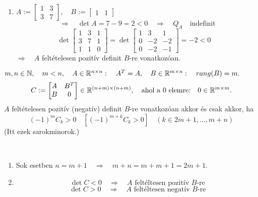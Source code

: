 \documentclass[a4paper,11.5pt]{article}
\begin{document}
\begin{note}
\begin{enumerate}
			\item $A:=\begin{bmatrix}
			1&3\\
			3&7
			\end{bmatrix},\quad B:=\begin{bmatrix}
				1&1
			\end{bmatrix}$
			\[ \Rightarrow\quad \det A=7-9=2<0\quad \Rightarrow\quad Q_A \quad \text{indefinit} \]
			\[ \det \begin{bmatrix}
				1&3&1\\
				3&7&1\\
				1&1&0
			\end{bmatrix}=\det \begin{bmatrix}
				1&3&1\\
				0&-2&-2\\
				0&-2&-1
			\end{bmatrix}=-2<0\quad \]
			$\Rightarrow\quad A$ feltételesen pozitív definit $B$-re vonatkozóan.
		\end{enumerate}
	\end{note}
	\begin{theorem}
		$m,n\in\mathbb{N},\quad m<n,\quad A\in\mathbb{R}^{n\times n}:\quad A^T=A,\quad B\in\mathbb{R}^{m\times n}:\quad rang(B)=m.$
		\[ C:=\begin{bmatrix}
			A&B^T\\
			B&0
		\end{bmatrix}\in\mathbb{R}^{(n+m)\times(n+m)},\quad \text{ahol a 0 elemre:}\quad 0\in\mathbb{R}^{m\times m}. \]
		$A$ feltételesen pozitív (negatív) definit $B$-re vonatkozóan akkor és csak akkor, ha
		\[ (-1)^m C_k>0\quad [(-1)^{m+k}C_k>0]\quad (k\in{2m+1,\ldots,m+n}) \]
		(Itt ezek sarokminorok.)
	\end{theorem}
	\begin{note}\
	
		\begin{enumerate}
			\item Sok esetben $n=m+1\quad \Rightarrow\quad m+n=m+m+1=2m+1$.
			\item\[ \det C<0\quad \Rightarrow\quad \text{$A$ feltéltesen pozitív $B$-re} \]
			\[ \det C>0\quad \Rightarrow\quad \text{$A$ feltéltesen negatív $B$-re} \]
		\end{enumerate}
	\end{note}
\end{document}
